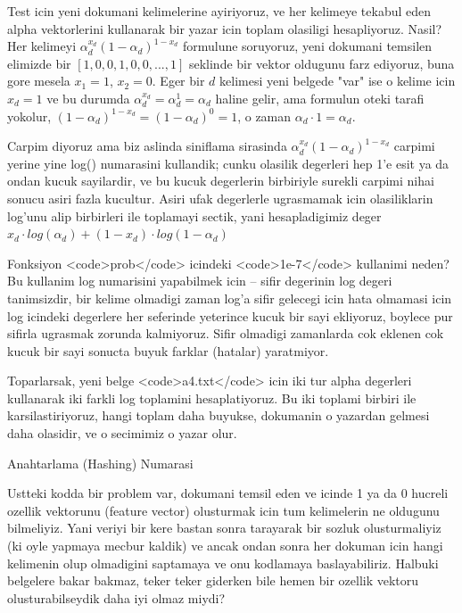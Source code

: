 \documentclass[12pt,fleqn]{article}\usepackage{../common}
\begin{document}
Test icin yeni dokumani kelimelerine ayiriyoruz, ve her kelimeye tekabul eden
alpha vektorlerini kullanarak bir yazar icin toplam olasiligi
hesapliyoruz. Nasil? Her kelimeyi $\alpha_d^{x_d}(1-\alpha_d)^{1-x_d}$ formulune
soruyoruz, yeni dokumani temsilen elimizde bir $[1,0,0,1,0,0,...,1]$ seklinde
bir vektor oldugunu farz ediyoruz, buna gore mesela $x_1=1$, $x_2=0$. Eger bir
$d$ kelimesi yeni belgede "var" ise o kelime icin $x_d = 1$ ve bu durumda
$\alpha_d^{x_d} = \alpha_d^{1} = \alpha_d$ haline gelir, ama formulun oteki
tarafi yokolur, $(1-\alpha_d)^{1-x_d} = (1-\alpha_d)^0 = 1$, o zaman $\alpha_d
\cdot 1 = \alpha_d$.

Carpim diyoruz ama biz aslinda siniflama sirasinda
$\alpha_d^{x_d}(1-\alpha_d)^{1-x_d}$ carpimi yerine yine log() numarasini
kullandik; cunku olasilik degerleri hep 1'e esit ya da ondan kucuk sayilardir,
ve bu kucuk degerlerin birbiriyle surekli carpimi nihai sonucu asiri fazla
kucultur. Asiri ufak degerlerle ugrasmamak icin olasiliklarin log'unu alip
birbirleri ile toplamayi sectik, yani hesapladigimiz deger $x_d \cdot
log(\alpha_d) + (1-x_d) \cdot log(1-\alpha_d)$

Fonksiyon <code>prob</code> icindeki <code>1e-7</code> kullanimi neden? Bu
kullanim log numarisini yapabilmek icin -- sifir degerinin log degeri
tanimsizdir, bir kelime olmadigi zaman log'a sifir gelecegi icin hata
olmamasi icin log icindeki degerlere her seferinde yeterince kucuk bir
sayi ekliyoruz, boylece pur sifirla ugrasmak zorunda kalmiyoruz. Sifir
olmadigi zamanlarda cok eklenen cok kucuk bir sayi sonucta buyuk
farklar (hatalar) yaratmiyor.

Toparlarsak, yeni belge <code>a4.txt</code> icin iki tur alpha
degerleri kullanarak iki farkli log toplamini hesaplatiyoruz. Bu iki
toplami birbiri ile karsilastiriyoruz, hangi toplam daha buyukse,
dokumanin o yazardan gelmesi daha olasidir, ve o secimimiz o yazar
olur.

Anahtarlama (Hashing) Numarasi

Ustteki kodda bir problem var, dokumani temsil eden ve icinde 1 ya da
0 hucreli ozellik vektorunu (feature vector) olusturmak icin tum
kelimelerin ne oldugunu bilmeliyiz. Yani veriyi bir kere bastan sonra
tarayarak bir sozluk olusturmaliyiz (ki oyle yapmaya mecbur kaldik) ve
ancak ondan sonra her dokuman icin hangi kelimenin olup olmadigini
saptamaya ve onu kodlamaya baslayabiliriz. Halbuki belgelere bakar
bakmaz, teker teker giderken bile hemen bir ozellik vektoru
olusturabilseydik daha iyi olmaz miydi?
\end{document}
